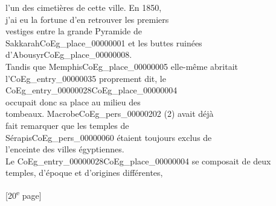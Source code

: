 \documentclass{book}
\begin{document}
{\begin{paracol}{2}
l’un des cimetières de cette ville. En 1850,\\
j’ai eu la fortune d’en retrouver les premiers\\
vestiges entre la grande Pyramide de\\
Sakkarah\gls{CoEg_place_00000001} et les buttes ruinées d’Abousyr\gls{CoEg_place_00000008}.\\
Tandis que Memphis\gls{CoEg_place_00000005} elle-même abritait\\
l’\Gls{CoEg_entry_00000035} proprement dit, le \Gls{CoEg_entry_00000028}\gls{CoEg_place_00000004}\\
occupait donc sa place au milieu des\\
tombeaux. Macrobe\gls{CoEg_pers_00000202} (2) avait déjà\\
fait remarquer que les temples de\\
Sérapis\gls{CoEg_pers_00000060} étaient toujours exclus de\\
l’enceinte des villes égyptiennes.\\
\indent Le \Gls{CoEg_entry_00000028}\gls{CoEg_place_00000004} se composait de deux\\
temples, d’époque et d’origines différentes,
\end{paracol}

{\footnotesize\begin{center} {[20\textsuperscript{e} page]}\end{center}}

}
\end{document}
